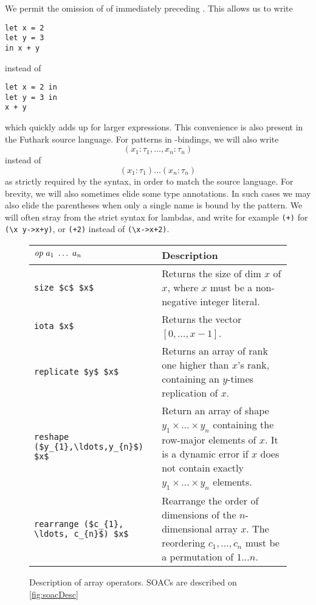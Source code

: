 We permit the omission of of  immediately preceding .
This allows us to write
\begin{lstlisting}
let x = 2
let y = 3
in x + y
\end{lstlisting}
  instead of
\begin{lstlisting}
let x = 2 in
let y = 3 in
x + y
\end{lstlisting}
  which quickly adds up for larger expressions.  This convenience is
  also present in the Futhark source language.  For patterns in
  -bindings, we will also write
\[
  (x_{1}: \tau_{1}, \ldots, x_{n}: \tau_{n})
\]
instead of
\[
  (x_{1}: \tau_{1}) \ldots (x_{n}: \tau_{n})
\]
as strictly required by the syntax, in order to match the source
language.  For brevity, we will also sometimes elide some type
annotations.  In such cases we may also elide the parentheses when
only a single name is bound by the pattern.  We will often stray from
the strict syntax for lambdas, and write for example \lstinline{(+)}
for \lstinline{(\x y->x+y)}, or \lstinline{(+2)} instead of
\lstinline{(\x->x+2)}.

\begin{figure}
\centering

\begin{tabular}{lp{58mm}}
  $\emph{op}~a_{1}~\ldots~a_{n}$ & Description \\ \hline
  \lstinline[mathescape]!size $c$ $x$! & Returns the size of dim $x$ of $x$, where $x$ must be a non-negative integer literal. \\
  \lstinline[mathescape]!iota $x$! & Returns the vector $[0,\ldots, x-1]$. \\
  \lstinline[mathescape]!replicate $y$ $x$! & Returns an array of rank one higher than $x$'s rank, containing an $y$-times replication of $x$.\\
  \lstinline[mathescape]!reshape ($y_{1},\ldots,y_{n}$) $x$! & Return an array of shape $y_{1}\times\ldots\times y_{n}$ containing the row-major elements of $x$.  It is a dynamic error if $x$ does not contain exactly $y_{1}\times\ldots\times y_{n}$ elements. \\
  \lstinline[mathescape]!rearrange ($c_{1}, \ldots, c_{n}$) $x$! & Rearrange the order of dimensions of the $n$-dimensional array $x$.  The reordering $c_{1}, \ldots, c_{n}$ must be a permutation of $1...n$. \\
\end{tabular}
\caption{Description of array operators.  SOACs are described on \cref{fig:soacDesc}}
\label{fig:arrayDesc}
\end{figure}

